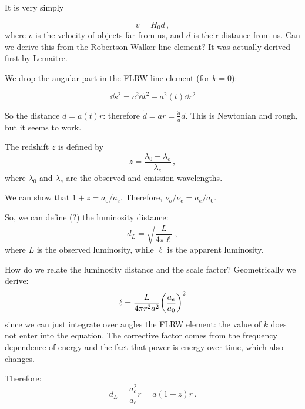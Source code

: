 \documentclass[main.tex]{subfiles}
\begin{document}
It is very simply

\begin{equation}
  v = H_0 d\,,
\end{equation}
%
where \(v\) is the velocity of objects far from us, and \(d\) is their distance from us. Can we derive this from the Robertson-Walker line element?
It was actually derived first by Lemaitre.

We drop the angular part in the FLRW line element (for \(k = 0\)):

\begin{equation}
  \dd{s^2} = c^2 \dd{t^2} - a^2(t) \dd{r^2}
\end{equation}

So the distance \(d = a(t) r\): therefore \(\dot{d} = \dot{a}r = \frac{\dot{a} }{a} d\).   This is Newtonian and rough, but it seems to work.

\begin{definition}[Redshift]
    The redshift \(z\) is defined by
    \begin{equation}
      z = \frac{\lambda_0 - \lambda_e}{\lambda_{e}}\,,
    \end{equation}
    where \(\lambda_0\) and \(\lambda_e\) are the observed and emission wavelengths.
\end{definition}

We can show that \(1+z = a_0/ a_e\). Therefore, \(\nu_o / \nu_e = a_e / a_0\).

So, we can define (?) the luminosity distance:
%
\begin{equation}
  d_L = \sqrt{\frac{L}{4 \pi \ell} } \,,
\end{equation}
%
where \(L\) is the observed luminosity, while \(\ell\) is the apparent luminosity.

How do we relate the luminosity distance and the scale factor? Geometrically we derive:
%
\begin{equation}
  \ell = \frac{L}{4 \pi r^2 a^2} \qty(\frac{a_e}{a_0}) ^2
\end{equation}
%
since we can just integrate over angles the FLRW element: the value of \(k\) does not enter into the equation.
The corrective factor comes from the frequency dependence of energy and the fact that power is energy over time, which also changes.

Therefore:
%
\begin{equation}
  d_L = \frac{a_o^2}{a_e} r = a (1+z) r\,.
\end{equation}
\end{document}
